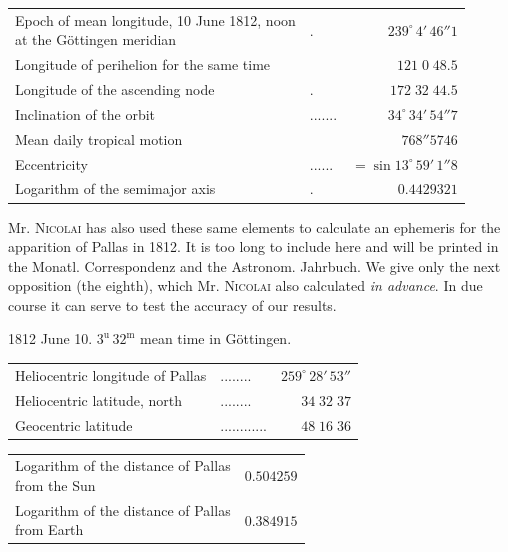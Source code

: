 \begin{center}\fontsize{10}{12}\selectfont\setlength{\tabcolsep}{4pt}\renewcommand{\arraystretch}{1.15}\begin{tabular}{llr}
\shortstack[l]{Epoch of mean longitude, 10 June 1812, noon\\at the Göttingen meridian} & . & $239^\circ\,4'\,46''1$\\
Longitude of perihelion for the same time &  & $121\;0\;48.5$\\
Longitude of the ascending node & . & $172\;32\;44.5$\\
Inclination of the orbit & .\;.\;.\;.\;.\;.\;. & $34^\circ\,34'\,54''7$\\
Mean daily tropical motion &  & $768''5746$\\
Eccentricity & .\;.\;.\;.\;.\;. & $=\sin13^\circ\,59'\,1''8$\\
Logarithm of the semimajor axis & . & $0.4429321$\\
\end{tabular}\end{center}

\par\indent Mr. \textsc{Nicolai} has also used these same elements to calculate an ephemeris for the apparition of Pallas in 1812. It is too long to include here and will be printed in the Monatl. Correspondenz and the Astronom. Jahrbuch. We give only the next opposition (the eighth), which Mr. \textsc{Nicolai} also calculated \emph{in advance}. In due course it can serve to test the accuracy of our results.
\begin{center}1812 June 10. $3^{\mathrm u}\,32^{\mathrm m}$ mean time in Göttingen.\end{center}

\begin{center}\fontsize{10}{12}\selectfont\setlength{\tabcolsep}{4pt}\renewcommand{\arraystretch}{1.15}\begin{tabular}{llr}
Heliocentric longitude of Pallas & .\;.\;.\;.\;.\;.\;.\;. & $259^\circ\,28'\,53''$\\
Heliocentric latitude, north & .\;.\;.\;.\;.\;.\;.\;. & $34\;32\;37$\\
Geocentric latitude & .\;.\;.\;.\;.\;.\;.\;.\;.\;.\;.\;. & $48\;16\;36$\\
\end{tabular}\end{center}

\begin{center}\fontsize{10}{12}\selectfont\setlength{\tabcolsep}{4pt}\renewcommand{\arraystretch}{1.15}\begin{tabular}{lr}
\shortstack[l]{Logarithm of the distance of Pallas\\from the Sun} & $0.504259$\\
\shortstack[l]{Logarithm of the distance of Pallas\\from Earth} & $0.384915$\\
\end{tabular}\end{center}

